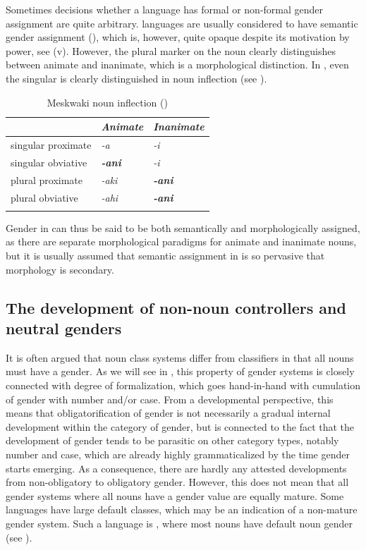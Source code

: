 \documentclass[output=collectionpaper]{langsci/langscibook}
\begin{document}
Sometimes decisions whether a language has formal or non-formal gender assignment are quite arbitrary.  languages are usually considered to have semantic gender assignment (\citealt[24]{Corbett1991}), which is, however, quite opaque despite its motivation by power, see  (v). However, the plural marker on the noun clearly distinguishes between animate and inanimate, which is a morphological distinction. In , even the singular is clearly distinguished in noun inflection (see ).

\begin{table}
  \caption{Meskwaki noun inflection (\citealt[10]{Thomason2003})}
\begin{tabular}{l>{\itshape}l>{\itshape}l}
\lsptoprule
  &	\normalfont Animate	& \normalfont	Inanimate	\\
\midrule
singular proximate	&	-a	&	-i	\\
singular obviative	&	\bfseries -ani	&	-i	\\
plural proximate	&	-aki	&	\bfseries -ani	\\
plural obviative	&	-ahi	&	\bfseries -ani	\\
\lspbottomrule
\end{tabular}
\label{tab:WDG:15}
\end{table}

Gender in  can thus be said to be both semantically and morphologically assigned, as there are separate morphological paradigms for animate and inanimate nouns, but it is usually assumed that semantic assignment in  is so pervasive that morphology is secondary.

  \subsection{The development of non-noun controllers and neutral genders}
\label{sec:WDG:6.5}

It is often argued that noun class systems differ from classifiers in that all nouns must have a gender. As we will see in , this property of gender systems is closely connected with degree of formalization, which goes hand-in-hand with cumulation of gender with number and/or case. From a developmental perspective, this means that obligatorification of gender is not necessarily a gradual internal development within the category of gender, but is connected to the fact that the development of gender tends to be parasitic on other category types, notably number and case, which are already highly grammaticalized by the time gender starts emerging. As a consequence, there are hardly any attested developments from non-obligatory to obligatory gender. However, this does not mean that all gender systems where all nouns have a gender value are equally mature. Some languages have large default classes, which may be an indication of a non-mature gender system. Such a language is , where most nouns have default noun gender (see \citealt{Waelchli2018}).
\end{document}
